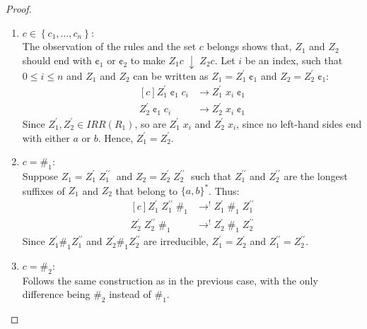 \documentclass{lmcs} %
\theoremstyle{plain}\newtheorem{satz}[thm]{Satz} %
\begin{document}
\begin{appendices}
\begin{proof}
  \begin{enumerate}[label=\roman*.]

  \item $c \in \left\{ c_1, \ldots , c_{n} \right\}$:\\
  The observation of the rules and the set $c$ belongs shows that, $Z_1$ and $Z_2$ should end with $\cent_1$ or $\cent_2$ to make $Z_1 c \; \downarrow \; Z_2 c$.
  Let $i$ be an index, such that $0 \leq i \leq n$ and $Z_1$ and $Z_2$ can be written as $Z_1 = {Z_1^{\prime}}\; \cent_1$ and $Z_2 = {Z_2^{\prime}}\; \cent_1$: 
  \begin{equation}
	\begin{aligned}[c]
		{Z_1^{\prime}}\;\cent_1\;c_i &\rightarrow {Z_1^{\prime}}\;x_i\;\cent_1 \\
		{Z_2^{\prime}}\;\cent_1\;c_i &\rightarrow {Z_2^{\prime}}\;x_i\;\cent_1
	\end{aligned}
  \end{equation}
  \noindent Since ${Z_1^{\prime}}, {Z_2^{\prime}} \in IRR(R_1^{})$, so are ${Z_1^{\prime}}\;x_i$ and ${Z_2^{\prime}}\;x_i$, since no left-hand sides end with either $a$ or $b$. 
  Hence, ${Z_1^{\prime}} = {Z_2^{\prime}}$.
    
  \item $c = \#_1$:\\
  Suppose $Z_1 = {Z_1^{\prime}}\;{Z_1^{\prime\prime}}\;$  and $Z_2 = {Z_2^{\prime}}\;{Z_2^{\prime\prime}}\;$ such that ${Z_1^{\prime\prime}}$ and ${Z_2^{\prime\prime}}$
  are the longest suffixes of $Z_1$ and $Z_2$ that belong to $\{a,b\}^{*}$. Thus:
   \begin{equation}
	\begin{aligned}[c]
		{Z_1^{\prime}}\;{Z_1^{\prime\prime}}\; \#_1&\rightarrow^{!} {Z_1^{\prime}}\; \#_1 \; {Z_1^{\prime\prime}} \\
		{Z_2^{\prime}}\;{Z_2^{\prime\prime}}\; \#_1&\rightarrow^{!} {Z_2^{\prime}}\; \#_1 \; {Z_2^{\prime\prime}}
	\end{aligned}
  \end{equation}
  Since ${Z_1^{\prime}} \#_1 {Z_1^{\prime\prime}}$ and ${Z_2^{\prime}} \#_1 {Z_2^{\prime\prime}}$ are irreducible, ${Z_1^{\prime}} = {Z_2^{\prime}}$ and 
  ${Z_1^{\prime\prime}} = {Z_2^{\prime\prime}}$.
  
  \item $c = \#_2$:\\  
  Follows the same construction as in the previous case, with the only difference being $\#_2$ instead of $\#_1$.
  

\end{enumerate}
\end{proof}
\end{appendices}
\end{document}
